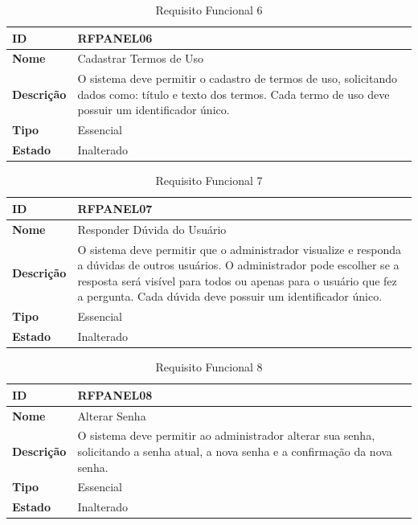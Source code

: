\begin{table}[H]
\centering
\begin{tabular}{|l|p{12cm}|}
\hline
\textbf{ID} & RFPANEL06 \\
\hline
\textbf{Nome} & Cadastrar Termos de Uso \\
\hline
\textbf{Descrição} & O sistema deve permitir o cadastro de termos de uso, solicitando dados como: título e texto dos termos. Cada termo de uso deve possuir um identificador único. \\
\hline
\textbf{Tipo} & Essencial \\
\hline
\textbf{Estado} & Inalterado \\
\hline
\end{tabular}
\caption[RFPANEL06 -- Cadastrar termos de uso]{Requisito Funcional 6}
\label{tab:rfpanel06}
\end{table}


\begin{table}[H]
\centering
\begin{tabular}{|l|p{12cm}|}
\hline
\textbf{ID} & RFPANEL07 \\
\hline
\textbf{Nome} & Responder Dúvida do Usuário \\
\hline
\textbf{Descrição} & O sistema deve permitir que o administrador visualize e responda a dúvidas de outros usuários. O administrador pode escolher se a resposta será visível para todos ou apenas para o usuário que fez a pergunta. Cada dúvida deve possuir um identificador único. \\
\hline
\textbf{Tipo} & Essencial \\
\hline
\textbf{Estado} & Inalterado \\
\hline
\end{tabular}
\caption[RFPANEL07 -- Responder dúvida do usuário]{Requisito Funcional 7}
\label{tab:rfpanel07}
\end{table}

\begin{table}[H]
\centering
\begin{tabular}{|l|p{12cm}|}
\hline
\textbf{ID} & RFPANEL08 \\
\hline
\textbf{Nome} & Alterar Senha \\
\hline
\textbf{Descrição} & O sistema deve permitir ao administrador alterar sua senha, solicitando a senha atual, a nova senha e a confirmação da nova senha. \\
\hline
\textbf{Tipo} & Essencial \\
\hline
\textbf{Estado} & Inalterado \\
\hline
\end{tabular}
\caption[RFPANEL08 -- Alterar senha]{Requisito Funcional 8}
\label{tab:rfpanel08}
\end{table}

